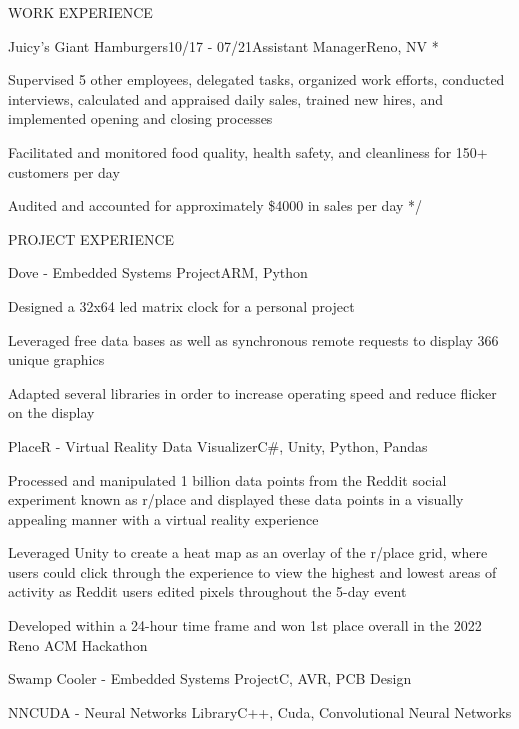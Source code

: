 \documentclass{resume} %
\begin{document}
\begin{rSection}{WORK EXPERIENCE}
	\begin{emptyrSubsection}{Juicy's Giant Hamburgers}{10/17 - 07/21}{Assistant Manager}{Reno, NV}
		\/*
		\item Supervised 5 other employees, delegated tasks, organized work efforts, conducted interviews, calculated and
		appraised daily sales, trained new hires, and implemented opening and closing processes
		\item Facilitated and monitored food quality, health safety, and cleanliness for 150+ customers per day
		\item Audited and accounted for approximately \$4000 in sales per day
		*/
	\end{emptyrSubsection}

\end{rSection}


\begin{rSection}{PROJECT EXPERIENCE}

	\begin{rSubsection}{Dove - Embedded Systems Project}{ARM, Python}{}{}
		\item Designed a 32x64 led matrix clock for a personal project
		\item Leveraged free data bases as well as synchronous remote requests to display 366 unique graphics
		\item Adapted several libraries in order to increase operating speed and reduce flicker on the display
	\end{rSubsection}

	\begin{rSubsection}{PlaceR - Virtual Reality Data Visualizer}{C\#, Unity, Python, Pandas}{}{}
		\item Processed and manipulated 1 billion data points from the Reddit social experiment known as r/place and displayed
		these data points in a visually appealing manner with a virtual reality experience
		\item Leveraged Unity to create a heat map as an overlay of the r/place grid, where users could click through the 
		experience to view the highest and lowest areas of activity as Reddit users edited pixels throughout the 5-day event
		\item Developed within a 24-hour time frame and won 1st place overall in the 2022 Reno ACM Hackathon
	\end{rSubsection}

	\begin{emptyrSubsection}{Swamp Cooler - Embedded Systems Project}{C, AVR, PCB Design}{}{}
	\end{emptyrSubsection}

	\begin{emptyrSubsection}{NNCUDA - Neural Networks Library}{C++, Cuda, Convolutional Neural Networks}{}{}
	\end{emptyrSubsection}

\end{rSection}
\end{document}
